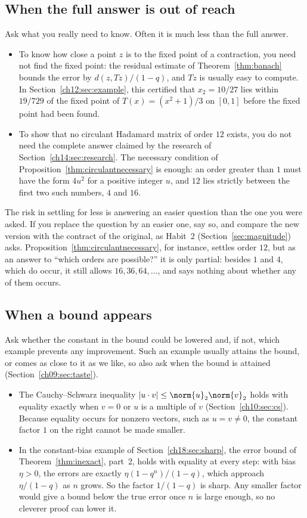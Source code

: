 \subsection*{When the full answer is out of reach}
Ask what you really need to know. Often it is much less than the full answer.
\begin{itemize}
\item To know how close a point $z$ is to the fixed point of a contraction, you need not find the fixed point: the residual estimate of Theorem~\ref{thm:banach} bounds the error by $d(z,Tz)/(1-q)$, and $Tz$ is usually easy to compute. In Section~\ref{ch12:sec:example}, this certified that $x_2=10/27$ lies within $19/729$ of the fixed point of $T(x)=(x^2+1)/3$ on $[0,1]$ before the fixed point had been found.
\item To show that no circulant Hadamard matrix of order $12$ exists, you do not need the complete answer claimed by the research of Section~\ref{ch14:sec:research}. The necessary condition of Proposition~\ref{thm:circulantnecessary} is enough: an order greater than $1$ must have the form $4u^2$ for a positive integer $u$, and $12$ lies strictly between the first two such numbers, $4$ and $16$.
\end{itemize}
The risk in settling for less is answering an easier question than the one you were asked. If you replace the question by an easier one, say so, and compare the new version with the contract of the original, as Habit~2 (Section~\ref{sec:magnitude}) asks. Proposition~\ref{thm:circulantnecessary}, for instance, settles order $12$, but as an answer to ``which orders are possible?'' it is only partial: besides $1$ and $4$, which do occur, it still allows $16,36,64,\ldots$, and says nothing about whether any of them occurs.

\subsection*{When a bound appears}
Ask whether the constant in the bound could be lowered and, if not, which example prevents any improvement. Such an example usually attains the bound, or comes as close to it as we like, so also ask when the bound is attained (Section~\ref{ch09:sec:taste}).
\begin{itemize}
\item The Cauchy--Schwarz inequality $|u\cdot v|\le\norm{u}_2\norm{v}_2$ holds with equality exactly when $v=0$ or $u$ is a multiple of $v$ (Section~\ref{ch10:sec:cs}). Because equality occurs for nonzero vectors, such as $u=v\ne0$, the constant factor $1$ on the right cannot be made smaller.
\item In the constant-bias example of Section~\ref{ch18:sec:sharp}, the error bound of Theorem~\ref{thm:inexact}, part~2, holds with equality at every step: with bias $\eta>0$, the errors are exactly $\eta(1-q^n)/(1-q)$, which approach $\eta/(1-q)$ as $n$ grows. So the factor $1/(1-q)$ is sharp. Any smaller factor would give a bound below the true error once $n$ is large enough, so no cleverer proof can lower it.
\end{itemize}
